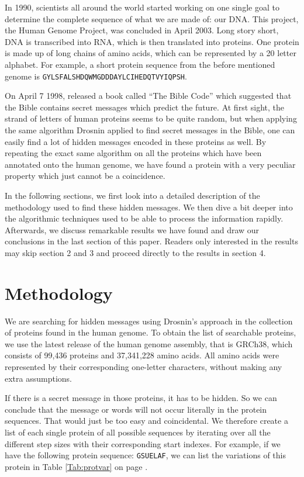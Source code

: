 \documentclass{bioinfo}
\begin{document}
In 1990, scientists all around the world started working on one single goal to determine the complete sequence of what we are made of: our DNA. This project, the Human Genome Project, was concluded in April 2003. Long story short, DNA is transcribed into RNA, which is then translated into proteins. One protein is made up of long chains of amino acids, which can be represented by a 20 letter alphabet. For example, a short protein sequence from the before mentioned genome is \texttt{GYLSFALSHDQWMGDDDAYLCIHEDQTVYIQPSH}.

On April 7 1998, \cite{biblecode} released a book called ``The Bible Code'' which suggested that the Bible contains secret messages which predict the future. At first sight, the strand of letters of human proteins seems to be quite random, but when applying the same algorithm Drosnin applied to find secret messages in the Bible, one can easily find a lot of hidden messages encoded in these proteins as well. By repeating the exact same algorithm on all the proteins which have been annotated onto the human genome, we have found a protein with a very peculiar property which just cannot be a coincidence.

In the following sections, we first look into a detailed description of the methodology used to find these hidden messages. We then dive a bit deeper into the algorithmic techniques used to be able to process the information rapidly. Afterwards, we discuss remarkable results we have found and draw our conclusions in the last section of this paper. Readers only interested in the results may skip section 2 and 3 and proceed directly to the results in section 4.

\section{Methodology}
We are searching for hidden messages using Drosnin's approach in the collection of proteins found in the human genome. To obtain the list of searchable proteins, we use the latest release of the human genome assembly, that is GRCh38, which consists of 99,436 proteins and 37,341,228 amino acids. All amino acids were represented by their corresponding one-letter characters, without making any extra assumptions.

If there is a secret message in those proteins, it has to be hidden. So we can conclude that the message or words will not occur literally in the protein sequences. That would just be too easy and coincidental. We therefore create a list of each single protein of all possible sequences by iterating over all the different step sizes with their corresponding start indexes. For example, if we have the following protein sequence: \texttt{GSUELAF}, we can list the variations of this protein in Table \ref{Tab:protvar} on page \pageref{Tab:protvar}.
\end{document}

